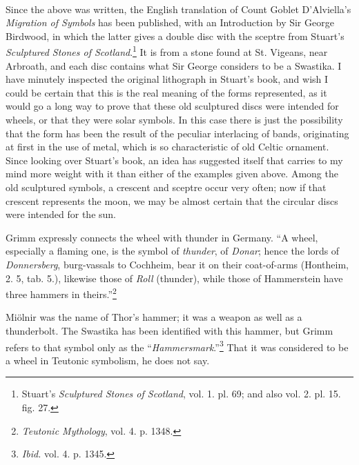 \documentclass[a4paper, 11pt, oneside, polutonikogreek, english]{article}
\begin{document}
\paragraph{}
Since the above was written, the English translation of Count Goblet D'Alviella's \emph{Migration of Symbols} has been published, with an Introduction by Sir George Birdwood, in which the latter gives a double disc with the sceptre from Stuart's \emph{Sculptured Stones of Scotland}.\footnote{Stuart's \emph{Sculptured Stones of Scotland}, vol. 1. pl. 69; and also vol. 2. pl. 15. fig. 27.} It is from a stone found at St. Vigeans, near Arbroath, and each disc contains what Sir George considers to be a Swastika. I have minutely inspected the original lithograph in Stuart's book, and wish I could be certain that this is the real meaning of the forms represented, as it would go a long way to prove that these old sculptured discs were intended for wheels, or that they were solar symbols. In this case there is just the possibility that the form has been the result of the peculiar interlacing of bands, originating at first in the use of metal, which is so characteristic of old Celtic ornament. Since looking over Stuart's book, an idea has suggested itself that carries to my mind more weight with it than either of the examples given above. Among the old sculptured symbols, a crescent and sceptre occur very often; now if that crescent represents the moon, we may be almost certain that the circular discs were intended for the sun.

Grimm expressly connects the wheel with thunder in Germany. ``A wheel, especially a flaming one, is the symbol of \emph{thunder}, of \emph{Donar}; hence the lords of \emph{Donnersberg}, burg-vassals to Cochheim, bear it on their coat-of-arms (Hontheim, 2. 5, tab. 5.), likewise those of \emph{Roll} (thunder), while those of Hammerstein have three hammers in theirs.''\footnote{\emph{Teutonic Mythology}, vol. 4. p. 1348.}

Miölnir was the name of Thor's hammer; it was a weapon as well as a thunderbolt. The Swastika has been identified with this hammer, but Grimm refers to that symbol only as the ``\emph{Hammersmark}.''\footnote{\emph{Ibid.} vol. 4. p. 1345.} That it was considered to be a wheel in Teutonic symbolism, he does not say.
\end{document}
